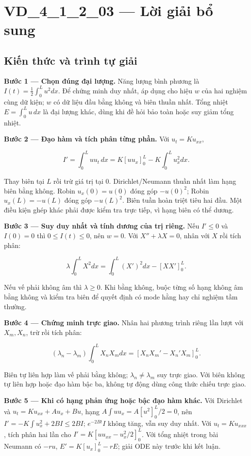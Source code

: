 \documentclass[10pt,a4paper]{article}
\begin{document}
\section*{VD\_4\_1\_2\_03 — Lời giải bổ sung}
\subsection*{Kiến thức và trình tự giải}
\textbf{Bước 1 — Chọn đúng đại lượng.} Năng lượng bình phương là $I(t)=\frac12\int_0^Lu^2dx$. Để chứng minh duy nhất, áp dụng cho hiệu $w$ của hai nghiệm cùng dữ kiện; $w$ có dữ liệu đầu bằng không và biên thuần nhất. Tổng nhiệt $E=\int_0^Lu\,dx$ là đại lượng khác, dùng khi đề hỏi bảo toàn hoặc suy giảm tổng nhiệt.

\textbf{Bước 2 — Đạo hàm và tích phân từng phần.} Với $u_t=Ku_{xx}$,


\[
I'=\int_0^Luu_t\,dx
=K[uu_x]_0^L-K\int_0^Lu_x^2dx.
\]


Thay biên tại $L$ rồi trừ giá trị tại $0$. Dirichlet/Neumann thuần nhất làm hạng biên bằng không. Robin $u_x(0)=u(0)$ đóng góp $-u(0)^2$; Robin $u_x(L)=-u(L)$ đóng góp $-u(L)^2$. Biên tuần hoàn triệt tiêu hai đầu. Một điều kiện ghép khác phải được kiểm tra trực tiếp, vì hạng biên có thể dương.

\textbf{Bước 3 — Suy duy nhất và tính dương của trị riêng.} Nếu $I'\le0$ và $I(0)=0$ thì $0\le I(t)\le0$, nên $w=0$. Với $X''+\lambda X=0$, nhân với $X$ rồi tích phân:


\[
\lambda\int_0^LX^2dx=\int_0^L(X')^2dx-[XX']_0^L.
\]


Nếu vế phải không âm thì $\lambda\ge0$. Khi bằng không, buộc từng số hạng không âm bằng không và kiểm tra biên để quyết định có mode hằng hay chỉ nghiệm tầm thường.

\textbf{Bước 4 — Chứng minh trực giao.} Nhân hai phương trình riêng lần lượt với $X_m,X_n$, trừ rồi tích phân:


\[
(\lambda_n-\lambda_m)\int_0^LX_nX_mdx
=[X_nX_m'-X_n'X_m]_0^L.
\]


Biên tự liên hợp làm vế phải bằng không; $\lambda_n\ne\lambda_m$ suy trực giao. Với biên không tự liên hợp hoặc đạo hàm bậc ba, không tự động dùng công thức chiếu trực giao.

\textbf{Bước 5 — Khi có hạng phản ứng hoặc bậc đạo hàm khác.} Với Dirichlet và $u_t=Ku_{xx}+Au_x+Bu$, hạng $A\int uu_x=A[u^2]_0^L/2=0$, nên $I'=-K\int u_x^2+2BI\le2BI$; $e^{-2Bt}I$ không tăng, vẫn suy duy nhất. Với $u_t=Ku_{xxx}$, tích phân hai lần cho $I'=K[uu_{xx}-u_x^2/2]_0^L$. Với tổng nhiệt trong bài Neumann có $-ru$, $E'=K[u_x]_0^L-rE$; giải ODE này trước khi kết luận.
\end{document}
